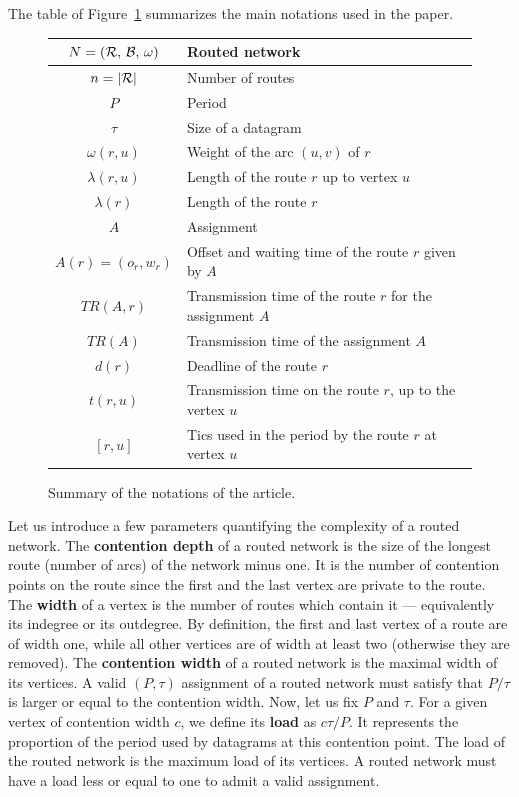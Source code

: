 \documentclass[a4paper,10pt]{journal}
\begin{document}
      The table of Figure~\ref{tab:summary} summarizes the main notations used in the paper.
    \begin{figure}
      \begin{center}
    \begin{tabularx}{\textwidth}{|c|X|}
    \hline
     $N = (\cal{R},\,\cal{B},\,\omega)$ & Routed network \\
     \hline
     $n = |\cal{R}|$ & Number of routes\\
     \hline
     $P$ & Period\\
     \hline
     $\tau$ & Size of a datagram\\
     \hline
     $\omega(r,u)$ & Weight of the arc $(u,v)$ of $r$ \\
     \hline
     $\lambda(r,u)$ & Length of the route $r$ up to vertex $u$\\
     \hline
     $\lambda(r)$ & Length of the route $r$\\
     \hline 
     $A$ & Assignment\\
     \hline 
     $A(r) = (o_r,w_r)$ & Offset and waiting time of the route $r$ given by $A$ \\
     \hline 
     $TR(A,r)$& Transmission time of the route $r$ for the assignment $A$\\
     \hline 
     $TR(A)$& Transmission time of the assignment $A$\\
     \hline
     $d(r)$ & Deadline of the route $r$\\
     \hline
	 $t(r,u)$ & Transmission time on the route $r$, up to the vertex $u$\\
     \hline
     $ [r,u]$ & Tics used in the period by the route $r$ at vertex $u$\\
     \hline
      \end{tabularx}
      \end{center}
      \caption{Summary of the notations of the article.}\label{tab:summary}
    \end{figure}
  	
  Let us introduce a few parameters quantifying the complexity of a routed network.
The \textbf{contention depth} of a routed network is the size of the longest route (number of arcs) of the network minus one. It is the number of contention points on the route since the first and the last vertex are private to the route. The \textbf{width} of a vertex is the number of routes which contain it --- equivalently its indegree or its outdegree. By definition,
the first and last vertex of a route are of width one, while all other vertices are of width at least two (otherwise they are removed).
The \textbf{contention width} of a routed network is the maximal width of its vertices.
A valid $(P,\tau)$ assignment of a routed network must satisfy that $P/\tau$ is larger or equal to the contention width. Now, let us fix $P$ and $\tau$. For a given vertex of contention width $c$, we define its \textbf{load} as $c\tau/P$. It represents the proportion of the period used by datagrams at this contention point. The load of the routed network is the maximum load of its vertices. A routed network must have a load less or equal to one to admit a valid assignment.
\end{document}
